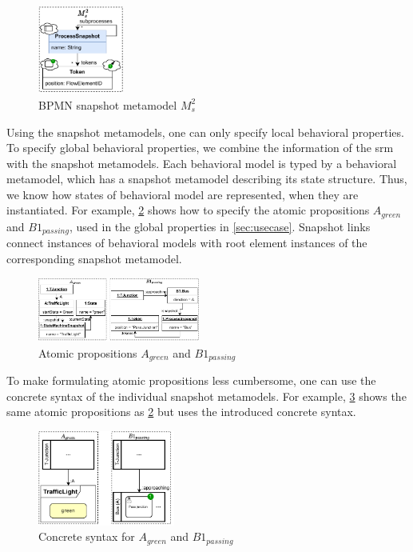 \documentclass{jot}
\begin{document}
\begin{figure}[h]
    \centering
    \includegraphics[width=0.25\textwidth]{figures/bpmn_snapshot_metamodel.pdf}
    \caption{BPMN snapshot metamodel $M_s^2$}
    \label{fig:bpmn_snapshot_metamodel}
\end{figure}

Using the snapshot metamodels, one can only specify local behavioral properties.
To specify global behavioral properties, we combine the information of the \gls*{srm} with the snapshot metamodels.
Each behavioral model is typed by a behavioral metamodel, which has a snapshot metamodel describing its state structure.
Thus, we know how states of behavioral model are represented, when they are instantiated.
For example, \cref{fig:atomic_propositions} shows how to specify the atomic propositions $A_{green}$ and $B1_{passing}$, used in the global properties in \autoref{sec:usecase}.
Snapshot links connect instances of behavioral models with root element instances of the corresponding snapshot metamodel. 

\begin{figure}[h]
    \centering
    \includegraphics[width=0.475\textwidth]{figures/atomic_props.pdf}
    \caption{Atomic propositions $A_{green}$ and $B1_{passing}$}
    \label{fig:atomic_propositions}
\end{figure}

To make formulating atomic propositions less cumbersome, one can use the concrete syntax of the individual snapshot metamodels.
For example, \cref{fig:atomic_propositions_concrete} shows the same atomic propositions as \cref{fig:atomic_propositions} but uses the introduced concrete syntax.

\begin{figure}[h]
    \centering
    \includegraphics[width=0.4\textwidth]{figures/atomic_props_concrete.pdf}
    \caption{Concrete syntax for $A_{green}$ and $B1_{passing}$}
    \label{fig:atomic_propositions_concrete}
\end{figure}
\end{document}
